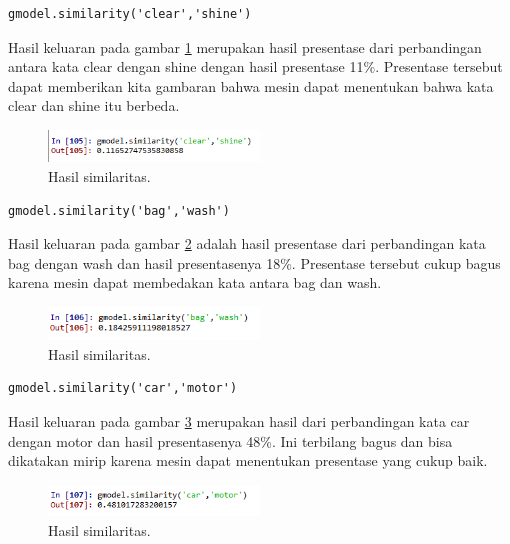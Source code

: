 \begin{enumerate}
\begin{verbatim}
gmodel.similarity('clear','shine')
\end{verbatim}
Hasil keluaran pada gambar \ref{sim5} merupakan hasil presentase dari perbandingan antara kata clear dengan shine dengan hasil presentase 11\%. Presentase tersebut dapat memberikan kita gambaran bahwa mesin dapat menentukan bahwa kata clear dan shine itu berbeda.
		\begin{figure}[ht]
		\centerline{\includegraphics[width=0.5\textwidth]{figures/im/sim5.png}}
		\caption{Hasil similaritas.}
		\label{sim5}
		\end{figure}

\begin{verbatim}
gmodel.similarity('bag','wash')
\end{verbatim}
Hasil keluaran pada gambar \ref{sim6} adalah hasil presentase dari perbandingan kata bag dengan wash dan hasil presentasenya 18\%. Presentase tersebut cukup bagus karena mesin dapat membedakan kata antara bag dan wash.
		\begin{figure}[ht]
		\centerline{\includegraphics[width=0.5\textwidth]{figures/im/sim6.png}}
		\caption{Hasil similaritas.}
		\label{sim6}
		\end{figure}

\begin{verbatim}
gmodel.similarity('car','motor')
\end{verbatim}
Hasil keluaran pada gambar \ref{sim7} merupakan hasil dari perbandingan kata car dengan motor dan hasil presentasenya 48\%. Ini terbilang bagus dan bisa dikatakan mirip karena mesin dapat menentukan presentase yang cukup baik.
		\begin{figure}[ht]
		\centerline{\includegraphics[width=0.5\textwidth]{figures/im/sim7.png}}
		\caption{Hasil similaritas.}
		\label{sim7}
		\end{figure}


\end{enumerate}

